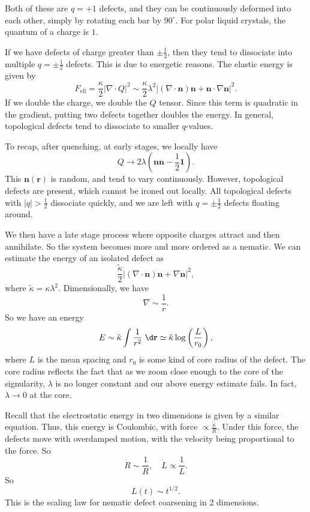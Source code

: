 \documentclass[a4paper]{article}
\begin{document}
Both of these are $q = +1$ defects, and they can be continuously deformed into each other, simply by rotating each bar by $90^\circ$. For polar liquid crystals, the quantum of a charge is $1$.

If we have defects of charge greater than $\pm \frac{1}{2}$, then they tend to dissociate into multiple $q = \pm \frac{1}{2}$ defects. This is due to energetic reasons. The elastic energy is given by
\[
  F_{\mathrm{ell}} = \frac{\kappa}{2} |\nabla \cdot Q|^2 \sim \frac{\kappa}{2} \lambda^2 |(\nabla \cdot \mathbf{n})\mathbf{n} + \mathbf{n} \cdot \nabla \mathbf{n}|^2.
\]
If we double the charge, we double the $Q$ tensor. Since this term is quadratic in the gradient, putting two defects together doubles the energy. In general, topological defects tend to dissociate to smaller $q$-values.

To recap, after quenching, at early stages, we locally have
\[
  Q \to 2\lambda (\mathbf{n} \mathbf{n} - \frac{1}{2}\mathbf{1}).
\]
This $\mathbf{n}(\mathbf{r})$ is random, and tend to vary continuously. However, topological defects are present, which cannot be ironed out locally. All topological defects with $|q| > \frac{1}{2}$ dissociate quickly, and we are left with $q = \pm \frac{1}{2}$ defects floating around.

We then have a late stage process where opposite charges attract and then annihilate. So the system becomes more and more ordered as a nematic. We can estimate the energy of an isolated defect as
\[
  \frac{\tilde{\kappa}}{2} |(\nabla \cdot \mathbf{n}) \mathbf{n} + \nabla \mathbf{n}|^2,
\]
where $\tilde{\kappa} = \kappa \lambda^2$. Dimensionally, we have
\[
  \nabla \sim \frac{1}{r}.
\]
So we have an energy
\[
  E \sim \tilde{\kappa} \int \frac{1}{r^2} \;\d \mathbf{r} \simeq \tilde{\kappa} \log \left(\frac{L}{r_0}\right),
\]
where $L$ is the mean spacing and $r_0$ is some kind of core radius of the defect. The core radius reflects the fact that as we zoom close enough to the core of the signularity, $\lambda$ is no longer constant and our above energy estimate fails. In fact, $\lambda \to 0$ at the core.

Recall that the electrostatic energy in two dimensions is given by a similar equation. Thus, this energy is Coulombic, with force $\propto \frac{\tilde{\kappa}}{R}$. Under this force, the defects move with overdamped motion, with the velocity being proportional to the force. So
\[
  \dot{R} \sim \frac{1}{R},\quad \dot{L} \propto \frac{1}{L}.
\]
So
\[
  L(t) \sim t^{1/2}.
\]
This is the scaling law for nematic defect coarsening in 2 dimensions.
\end{document}
